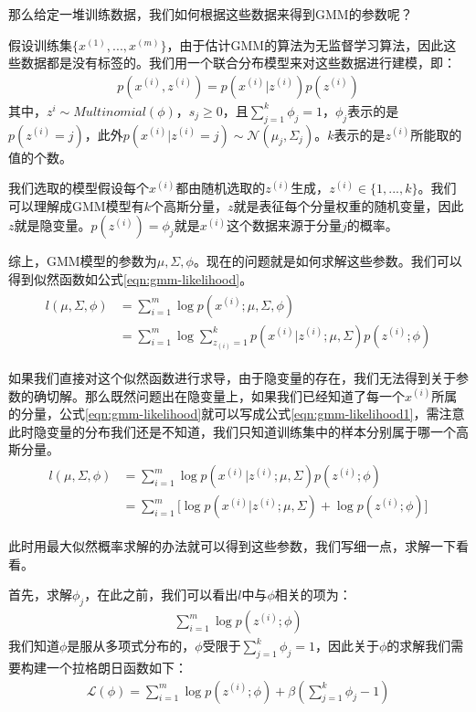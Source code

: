 那么给定一堆训练数据，我们如何根据这些数据来得到GMM的参数呢？

假设训练集$\{x^{(1)},...,x^{(m)}\}$，由于估计GMM的算法为无监督学习算法，因此这些数据都是没有标签的。我们用一个联合分布模型来对这些数据进行建模，即：
\begin{align}
p(x^{(i)}, z^{(i)})=p(x^{(i)}|z^{(i)})p(z^{(i)})
\end{align}
其中，$z^{i}\sim{Multinomial(\phi)}$，$s_{j} \geq 0$，且$\sum_{j=1}^{k} \phi_{j}=1$，$\phi_{j}$表示的是$p(z^{(i)}=j)$，此外$p(x^{(i)}|z^{(i)}=j)\sim{\mathcal{N}(\mu_j,\Sigma_j)}$。$k$表示的是$z^{(i)}$所能取的值的个数。

我们选取的模型假设每个$x^{(i)}$都由随机选取的$z^{(i)}$生成，$z^{(i)}\in\{1,...,k\}$。我们可以理解成GMM模型有$k$个高斯分量，$z$就是表征每个分量权重的随机变量，因此$z$就是隐变量。$p(z^{(i)})=\phi_{j}$就是$x^{(i)}$这个数据来源于分量$j$的概率。

综上，GMM模型的参数为$\mu,\Sigma,\phi$。现在的问题就是如何求解这些参数。我们可以得到似然函数如公式\ref{eqn:gmm-likelihood}。
\begin{align}
\label{eqn:gmm-likelihood}
\begin{split}
  l(\mu,\Sigma,\phi) 
      &= \sum_{i=1}^{m} \log p(x^{(i)};\mu,\Sigma,\phi) \\ 
      &= \sum_{i=1}^{m} \log \sum_{z_{(i)}=1}^{k} p(x^{(i)}|z^{(i)};\mu,\Sigma)p(z^{(i)};\phi)
\end{split}
\end{align}

如果我们直接对这个似然函数进行求导，由于隐变量的存在，我们无法得到关于参数的确切解。那么既然问题出在隐变量上，如果我们已经知道了每一个$x^{(i)}$所属的分量，公式\ref{eqn:gmm-likelihood}就可以写成公式\ref{eqn:gmm-likelihood1}，需注意此时隐变量的分布我们还是不知道，我们只知道训练集中的样本分别属于哪一个高斯分量。
\begin{align}
\label{eqn:gmm-likelihood1}
\begin{split}
  l(\mu,\Sigma,\phi) 
        &= \sum_{i=1}^{m} \log p(x^{(i)}|z^{(i)};\mu,\Sigma)p(z^{(i)};\phi) \\
        &= \sum_{i=1}^{m} \Big[\log p(x^{(i)}|z^{(i)};\mu,\Sigma) + \log p(z^{(i)};\phi) \Big]
\end{split}
\end{align}

此时用最大似然概率求解的办法就可以得到这些参数，我们写细一点，求解一下看看。

首先，求解$\phi_j$，在此之前，我们可以看出$l$中与$\phi$相关的项为：
\begin{align}\nonumber
  \sum_{i=1}^{m} \log p(z^{(i)};\phi) 
\end{align}
我们知道$\phi$是服从多项式分布的，$\phi$受限于$\sum_{j=1}^{k} \phi_{j}=1$，因此关于$\phi$的求解我们需要构建一个拉格朗日函数如下：
\begin{align}\nonumber
      \mathcal{L}(\phi) = \sum_{i=1}^{m} \log p(z^{(i)};\phi) + \beta(\sum_{j=1}^{k} \phi_{j}-1)
\end{align}

